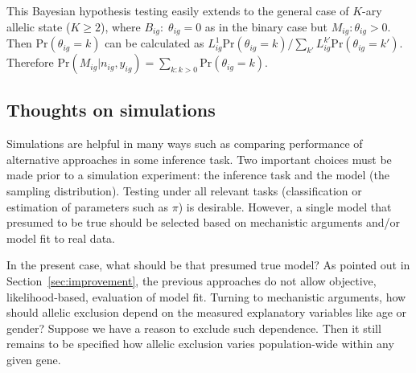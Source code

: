 \documentclass[letterpaper]{article}
\begin{document}
This Bayesian hypothesis testing easily extends to the general case of
\(K\)-ary allelic state (\(K\ge 2\)), where \(B_{ig} :\;
\theta_{ig}=0\) as in the binary case but \(M_{ig}: \theta_{ig}>0\).  Then
\(\mathrm{Pr}(\theta_{ig}=k)\) can be calculated as
\(
L_{ig}^1 \mathrm{Pr}(\theta_{ig}=k)
\big/
\sum_{k'} L_{ig}^{k'} \mathrm{Pr}(\theta_{ig}={k'})
\).  Therefore \(\mathrm{Pr}(M_{ig}|n_{ig},y_{ig}) = \sum_{k:k>0}
\mathrm{Pr}(\theta_{ig}=k)\).

\subsection{Thoughts on simulations}
\label{sec:simulation}

Simulations are helpful in many ways such as comparing performance of alternative approaches in
some inference task.  Two important choices must be made prior to a
simulation experiment: the inference task and the model (the sampling
distribution).  Testing under all relevant tasks (classification or estimation of parameters
such as \(\pi\)) is desirable.  However, a single model that presumed to be true should be selected based on mechanistic arguments and/or model fit to
real data.

In the present case, what should be that presumed true model?  As pointed out
in Section~\ref{sec:improvement}, the previous approaches do not allow
objective, likelihood-based, evaluation of model fit.  Turning to mechanistic
arguments, how should allelic exclusion depend on the measured explanatory
variables like age or gender?  Suppose we have a reason to exclude such
dependence.  Then it still remains to be specified how allelic exclusion
varies population-wide within any given gene.
\end{document}
